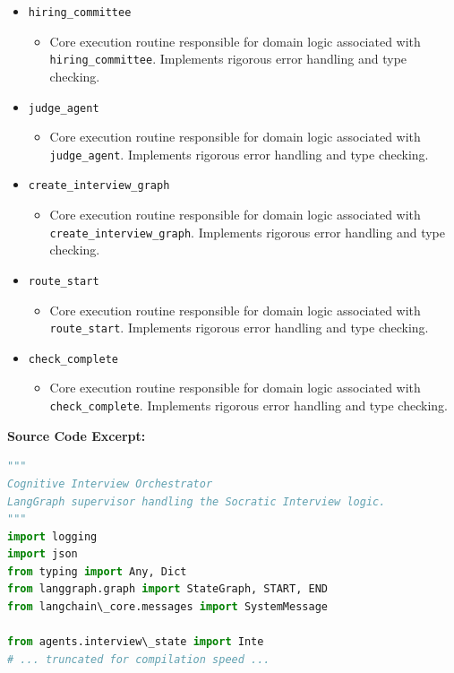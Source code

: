 \documentclass[10pt,journal,compsoc]{IEEEtran}
\begin{document}
\begin{itemize}
    \item \texttt{hiring\_committee}
    \begin{itemize} \item Core execution routine responsible for domain logic associated with \texttt{hiring\_committee}. Implements rigorous error handling and type checking. \end{itemize}
    \item \texttt{judge\_agent}
    \begin{itemize} \item Core execution routine responsible for domain logic associated with \texttt{judge\_agent}. Implements rigorous error handling and type checking. \end{itemize}
    \item \texttt{create\_interview\_graph}
    \begin{itemize} \item Core execution routine responsible for domain logic associated with \texttt{create\_interview\_graph}. Implements rigorous error handling and type checking. \end{itemize}
    \item \texttt{route\_start}
    \begin{itemize} \item Core execution routine responsible for domain logic associated with \texttt{route\_start}. Implements rigorous error handling and type checking. \end{itemize}
    \item \texttt{check\_complete}
    \begin{itemize} \item Core execution routine responsible for domain logic associated with \texttt{check\_complete}. Implements rigorous error handling and type checking. \end{itemize}
\end{itemize}
\textbf{Source Code Excerpt:}
\begin{lstlisting}[language=Python]
"""
Cognitive Interview Orchestrator
LangGraph supervisor handling the Socratic Interview logic.
"""
import logging
import json
from typing import Any, Dict
from langgraph.graph import StateGraph, START, END
from langchain\_core.messages import SystemMessage

from agents.interview\_state import Inte
# ... truncated for compilation speed ...
\end{lstlisting}
\end{document}
